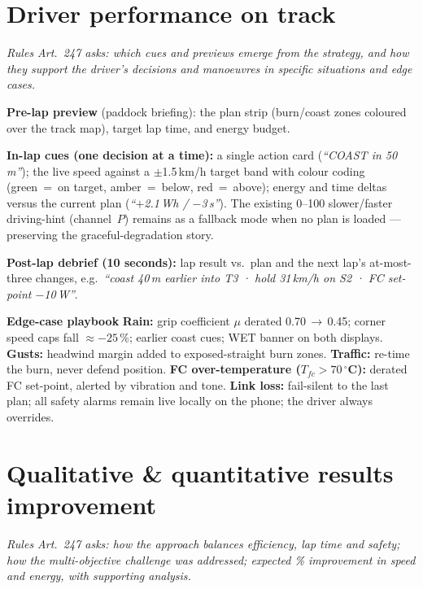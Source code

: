\documentclass[11pt,a4paper]{article}
\newcommand{\tenpt}{\fontsize{10}{12}\selectfont}
\newcommand{\question}[1]{\vspace{-0.15em}%
  {\tenpt\color{graphite}\itshape Rules Art.~247 asks: #1}\par\vspace{0.3em}}
\begin{document}
\section{Driver performance on track}
\question{which cues and previews emerge from the strategy, and how they
support the driver's decisions and manoeuvres in specific situations and
edge cases.}

\textbf{Pre-lap preview} (paddock briefing): the plan strip (burn/coast zones
coloured over the track map), target lap time, and energy budget.

\textbf{In-lap cues (one decision at a time):}
a single action card (\textit{``COAST in 50\,m''});
the live speed against a $\pm$1.5\,km/h target band with colour coding
(green~=~on target, amber~=~below, red~=~above);
energy and time deltas versus the current plan (\textit{``$+$2.1\,Wh / $-$3\,s''}).
The existing 0--100 slower/faster driving-hint (channel~$P$) remains as a
fallback mode when no plan is loaded — preserving the graceful-degradation
story.

\textbf{Post-lap debrief (10 seconds):} lap result vs.\ plan and the next
lap's at-most-three changes, e.g.\ \textit{``coast 40\,m earlier into T3 · hold
31\,km/h on S2 · FC set-point $-$10\,W''}.

\begin{tcolorbox}[swisspanel]
\tenpt\color{ink}\textbf{Edge-case playbook}\quad\color{graphite}
\textbf{Rain:} grip coefficient $\mu$ derated 0.70\,$\to$\,0.45;
corner speed caps fall $\approx -25\,\%$; earlier coast cues; WET banner on
both displays. \quad
\textbf{Gusts:} headwind margin added to exposed-straight burn zones. \quad
\textbf{Traffic:} re-time the burn, never defend position. \quad
\textbf{FC over-temperature ($T_{fc}>70\,^{\circ}$C):} derated FC
set-point, alerted by vibration and tone. \quad
\textbf{Link loss:} fail-silent to the last plan; all safety alarms remain
live locally on the phone; the driver always overrides.
\end{tcolorbox}

\section{Qualitative \& quantitative results improvement}
\question{how the approach balances efficiency, lap time and safety; how the
multi-objective challenge was addressed; expected \% improvement in speed
and energy, with supporting analysis.}
\end{document}
